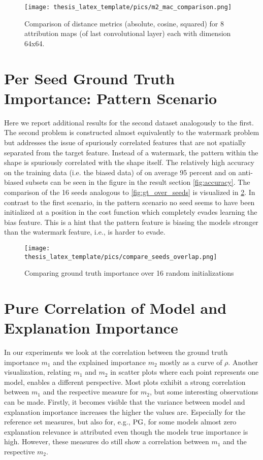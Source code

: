 \begin{figure}
    \centering
    \texttt{[image: thesis\_latex\_template/pics/m2\_mac\_comparison.png]}
    \caption[Attribution Maps, Distance Types]{Comparison of distance metrics (absolute, cosine, squared) for 8 attribution maps (of last convolutional layer) each with dimension 64x64.}
    \label{fig:m2_mac_comparison}
\end{figure}


\section{Per Seed Ground Truth Importance: Pattern Scenario}\label{appendix:pattern_scenario}
Here we report additional results for the second dataset analogously to the first.
The second problem is constructed almost equivalently to the watermark problem but addresses the issue of spuriously correlated features that are not spatially separated from the target feature.
Instead of a watermark, the pattern within the shape is spuriously correlated with the shape itself. 
The relatively high accuracy on the training data (i.e. the biased data) of on average 95 percent and on anti-biased subsets can be seen in the figure in the result section \cref{fig:accuracy}.
The comparison of the 16 seeds analogous to \cref{fig:gt_over_seeds} is visualized in 
\cref{fig:compare_seeds_overlap}. In contrast to the first scenario, in the pattern scenario no seed seems to have been initialized at a position in the cost function which completely evades learning the bias feature.
This is a hint that the pattern feature is biasing the models stronger than the watermark feature, i.e., is harder to evade.

\begin{figure}[!htb]
	\centering
	\label{fig:compare_seeds_overlap}
	\texttt{[image: thesis\_latex\_template/pics/compare\_seeds\_overlap.png]}
	\caption[Comparing Random Initialization Seeds, Pattern Scenario ]{Comparing ground truth importance over 16 random initializations}
\end{figure}



\section{Pure Correlation of Model and Explanation Importance}

In our experiments we look at the correlation between the ground truth importance $m_1$ and the explained importance $m_2$ mostly as a curve of $\rho$. Another visualization, relating $m_1$ and $m_2$ in scatter plots where each point represents one model, enables a different perspective. Most plots exhibit a strong correlation between $m_1$ and the respective measure for $m_2$, but some interesting observations can be made. Firstly, it becomes visible that the variance between model and explanation importance increases the higher the values are. Especially for the reference set measures, but also for, e.g., $\operatorname*{PG}$, for some models almost zero explanation relevance is attributed even though the models true importance is high. However, these measures do still show a correlation between $m_1$ and the respective $m_2$.

